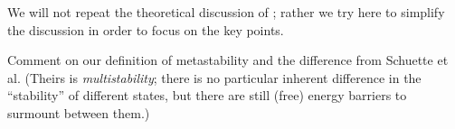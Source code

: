 \documentclass[10pt]{article}
\begin{document}
We will not repeat the theoretical discussion of
\cite{LarraldeLeyvrazSandersJStatMech2006}; rather we try here to simplify the
discussion in order to focus on the key points.

Comment on our definition of metastability and the difference from Schuette et
al. (Theirs is \emph{multistability}; there is no particular inherent difference in
the ``stability'' of different states, but there are still (free) energy 
barriers to surmount between them.)



% 
\end{document}
